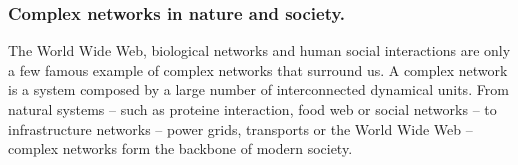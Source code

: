 \documentclass[table]{report}
\begin{document}
%
%
%
%
%
%
\subsubsection{Complex networks in nature and society.}
\bigbreak

The World Wide Web, biological networks and human social interactions are only a few famous example of complex networks that surround us. A complex network is a system composed by a large number of interconnected dynamical units. From natural systems – such as proteine interaction, food web or social networks – to infrastructure networks – power grids, transports or the World Wide Web – complex networks form the backbone of modern society. 
\medbreak
\end{document}

